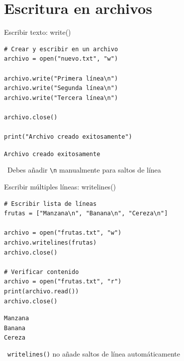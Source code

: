\documentclass{beamer}
\begin{document}
\section{Escritura en archivos}

\begin{frame}[fragile]{Escribir texto: write() \faPencilAlt}
\begin{lstlisting}
# Crear y escribir en un archivo
archivo = open("nuevo.txt", "w")

archivo.write("Primera línea\n")
archivo.write("Segunda línea\n")
archivo.write("Tercera línea\n")

archivo.close()

print("Archivo creado exitosamente")
\end{lstlisting}

\vspace{-0.2cm}
\begin{tcolorbox}[colback=green!10,colframe=green,title={\small\faArrowCircleRight \ Salida},coltitle=fg0,left=3pt,right=3pt,top=2pt,bottom=2pt,boxsep=1pt]
\small\texttt{Archivo creado exitosamente}
\end{tcolorbox}

\vspace{-0.1cm}
\begin{notebox}
\small\faExclamationTriangle\ Debes añadir \texttt{\textbackslash n} manualmente para saltos de línea
\end{notebox}
\end{frame}

\begin{frame}[fragile]{Escribir múltiples líneas: writelines() \faListAlt}
\begin{lstlisting}
# Escribir lista de líneas
frutas = ["Manzana\n", "Banana\n", "Cereza\n"]

archivo = open("frutas.txt", "w")
archivo.writelines(frutas)
archivo.close()

# Verificar contenido
archivo = open("frutas.txt", "r")
print(archivo.read())
archivo.close()
\end{lstlisting}

\vspace{-0.2cm}
\begin{tcolorbox}[colback=green!10,colframe=green,title={\small\faArrowCircleRight \ Salida},coltitle=fg0,left=3pt,right=3pt,top=2pt,bottom=2pt,boxsep=1pt]
\small\texttt{Manzana\\
Banana\\
Cereza}
\end{tcolorbox}

\vspace{-0.1cm}
\begin{notebox}
\small\faInfoCircle\ \texttt{writelines()} no añade saltos de línea automáticamente
\end{notebox}
\end{frame}
\end{document}
